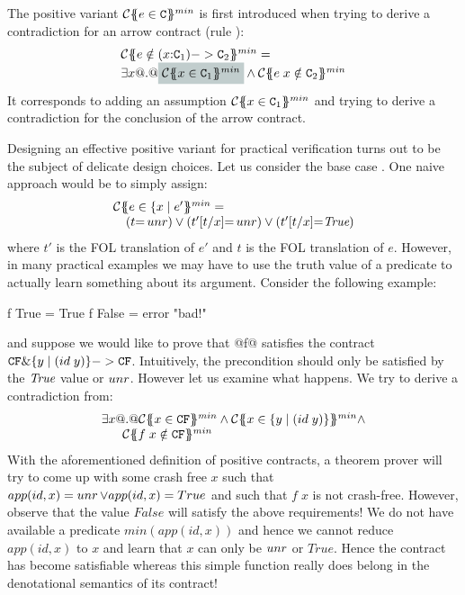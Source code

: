 The positive variant $\ctransmin{}{\Gamma}{e \in \Ct}$ is first introduced when
trying to derive a contradiction for an arrow contract (rule ):
\[\begin{array}{l}
   \ctransmin{\Sigma}{\Gamma}{e \notin (x{:}\Ct_1) -> \Ct_2}  = \\
    \exists x @.@ \highlight{\ctransmin{\Sigma}{\Gamma,x}{x \in \Ct_1}} \land \ctransmin{\Sigma}{\Gamma,x}{e\;x \notin \Ct_2}
\end{array}\]
It corresponds to adding an assumption $\ctransmin{\Sigma}{\Gamma,x}{x \in \Ct_1}$ and trying to
derive a contradiction for the conclusion of the arrow contract.

Designing an effective positive variant for practical verification turns out to be the subject of
delicate design choices. Let us consider the base case . One naive approach would
be to simply assign:
\[\begin{array}{l}
     \ctransmin{}{\Gamma}{e \in \{ x \mid e' } = \\
     \quad (t{=}\unr) \lor (t'[t/x]{=}\unr) \lor (t'[t/x]{=}\True)
\end{array}\]
where $t'$ is the FOL translation of $e'$ and $t$ is the FOL translation of $e$.
However, in many practical examples we may have to use the truth value of a predicate to actually learn something
about its argument. Consider the following example:
\begin{code}
f True  = True
f False = error "bad!"
\end{code}
and suppose we would like to prove that @f@ satisfies the contract $\CF \& \{ y \mid (id\;y) \} -> \CF$. Intuitively,
the precondition should only be satisfied by the $\True$ value or $\unr$. However let us examine what happens. We try
to derive a contradiction from:
\[\begin{array}{l}
    \exists x @.@ \ctransmin{}{\Gamma}{x \in \CF} \land \ctransmin{}{\Gamma}{x \in \{ y \mid (id\;y)\}} \land \\
    \phantom{\exists x \;\;} \ctransmin{}{\Gamma}{f\;x \notin \CF}
\end{array}\]
With the aforementioned definition of positive contracts,
a theorem prover will try to come up with some crash free $x$ such that $app(id,x) = \unr \lor app(id,x) = True$
and such that $f\;x$ is not crash-free. However, observe that the value $False$ will satisfy the above requirements!
We do not have available a predicate $min(app(id,x))$ and hence we cannot reduce $app(id,x)$ to $x$ and learn that $x$
can only be $\unr$ or $True$. Hence the contract has become satisfiable whereas this simple function really does belong
in the denotational semantics of its contract!

